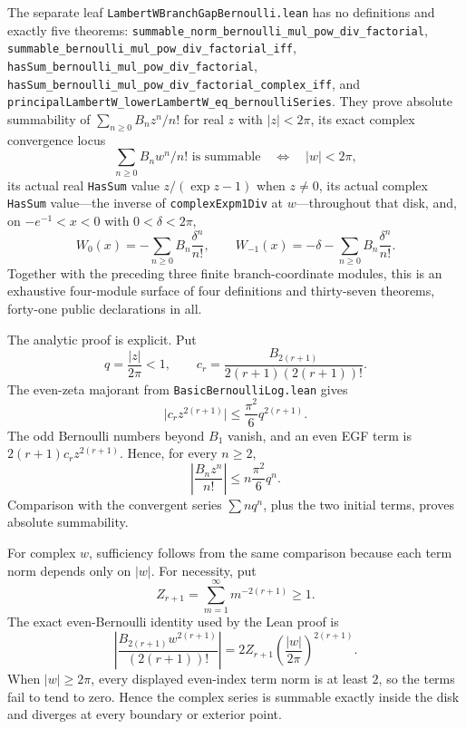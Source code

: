 \documentclass[11pt,oneside]{article}
\theoremstyle{definition}
\theoremstyle{remark}
\begin{document}
The separate leaf
\nolinkurl{LambertWBranchGapBernoulli.lean} has no definitions and exactly
five theorems:
\nolinkurl{summable_norm_bernoulli_mul_pow_div_factorial},
\nolinkurl{summable_bernoulli_mul_pow_div_factorial_iff},
\nolinkurl{hasSum_bernoulli_mul_pow_div_factorial},
\nolinkurl{hasSum_bernoulli_mul_pow_div_factorial_complex_iff}, and
\nolinkurl{principalLambertW_lowerLambertW_eq_bernoulliSeries}.
They prove absolute summability of
\(\sum_{n\geq0}B_nz^n/n!\) for real \(z\) with \(\lvert z\rvert<2\pi\), its
exact complex convergence locus
\[
 \sum_{n\geq0}B_nw^n/n!\text{ is summable}
 \quad\Longleftrightarrow\quad \lvert w\rvert<2\pi,
\]
its actual real \nolinkurl{HasSum} value \(z/(\exp z-1)\) when \(z\ne0\),
its actual complex \nolinkurl{HasSum} value---the inverse of
\nolinkurl{complexExpm1Div} at \(w\)---throughout that disk, and, on
\(-e^{-1}<x<0\) with \(0<\delta<2\pi\),
\[
 W_0(x)=-\sum_{n\geq0}B_n\frac{\delta^n}{n!},\qquad
 W_{-1}(x)=-\delta-\sum_{n\geq0}B_n\frac{\delta^n}{n!}.
\]
Together with the preceding three finite branch-coordinate modules, this is
an exhaustive four-module surface of four definitions and thirty-seven
theorems, forty-one public declarations in all.

The analytic proof is explicit.  Put
\[
 q=\frac{\lvert z\rvert}{2\pi}<1,\qquad
 c_r=\frac{B_{2(r+1)}}{2(r+1)(2(r+1))!}.
\]
The even-zeta majorant from \nolinkurl{BasicBernoulliLog.lean} gives
\[
 \lvert c_rz^{2(r+1)}\rvert
 \le\frac{\pi^2}{6}q^{2(r+1)}.
\]
The odd Bernoulli numbers beyond \(B_1\) vanish, and an even EGF term is
\(2(r+1)c_rz^{2(r+1)}\).  Hence, for every \(n\ge2\),
\[
 \left\lvert\frac{B_nz^n}{n!}\right\rvert
 \le n\frac{\pi^2}{6}q^n.
\]
Comparison with the convergent series \(\sum n q^n\), plus the two initial
terms, proves absolute summability.

For complex \(w\), sufficiency follows from the same comparison because each
term norm depends only on \(\lvert w\rvert\).  For necessity, put
\[
 Z_{r+1}=\sum_{m=1}^{\infty}m^{-2(r+1)}\ge1.
\]
The exact even-Bernoulli identity used by the Lean proof is
\[
 \left\lvert
   \frac{B_{2(r+1)}w^{2(r+1)}}{(2(r+1))!}
 \right\rvert
 =2Z_{r+1}
  \left(\frac{\lvert w\rvert}{2\pi}\right)^{2(r+1)}.
\]
When \(\lvert w\rvert\ge2\pi\), every displayed even-index term norm is at
least \(2\), so the terms fail to tend to zero.  Hence the complex series is
summable exactly inside the disk and diverges at every boundary or exterior
point.
\end{document}

